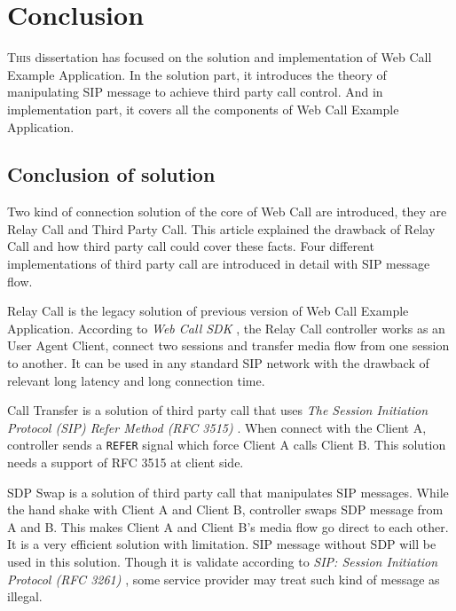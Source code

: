 
\chapter{Conclusion}
\label{sec:Conclusion}

\lettrine[lines=3]{T}{his} dissertation has focused on the solution and implementation of Web Call Example Application. In the solution part, it introduces the theory of manipulating SIP message to achieve third party call control. And in implementation part, it covers all the components of Web Call Example Application.

\section{Conclusion of solution}

Two kind of connection solution of the core of Web Call are introduced, they are Relay Call and Third Party Call. This article explained the drawback of Relay Call and how third party call could cover these facts. Four different implementations of third party call are introduced in detail with SIP message flow.

\textsf{Relay Call} is the legacy solution of previous version of \textsf{Web Call Example Application}. According to \textit{Web Call SDK} \cite{WebCallSDK}, the \textsf{Relay Call} controller works as an User Agent Client, connect two sessions and transfer media flow from one session to another. It can be used in any standard SIP network with the drawback of relevant long latency and long connection time.

\textsf{Call Transfer} is a solution of third party call that uses \textit{The Session Initiation Protocol (SIP) Refer Method (RFC 3515)} \cite{RFC3515}. When connect with the Client A, controller sends a \texttt{REFER} signal which force Client A calls Client B. This solution needs a support of RFC 3515 at client side.

\textsf{SDP Swap} is a solution of third party call that manipulates SIP messages. While the hand shake with Client A and Client B, controller swaps SDP message from A and B. This makes Client A and Client B's media flow go direct to each other.  It is a very efficient solution with limitation. SIP message without SDP will be used in this solution. Though it is validate according to \textit{SIP: Session Initiation Protocol 
(RFC 3261)} \cite{RFC3261}, some service provider may treat such kind of message as illegal. 


